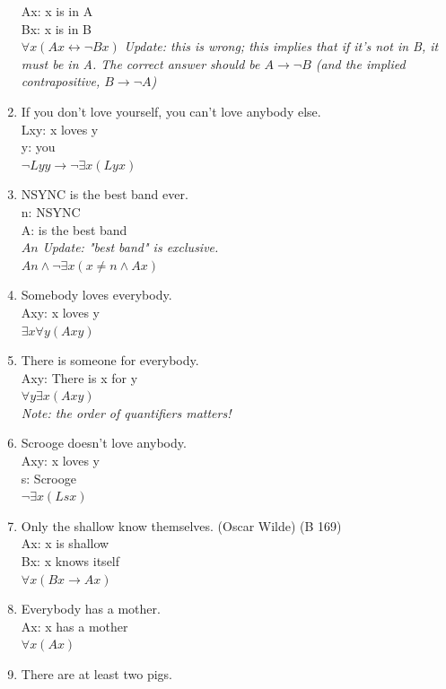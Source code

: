\documentclass{article}
\begin{document}
\begin{enumerate}
            Ax: x is in A\\
            Bx: x is in B\\
            $\forall x(Ax \leftrightarrow \neg Bx)$
            \textit{Update: this is wrong; this implies that if it's not in B, it must be in A. The correct answer should be $A \to \neg B$ (and the implied contrapositive, $B \to \neg A$)}
      \item If you don't love yourself, you can't love anybody else.\\
            Lxy: x loves y\\
            y: you\\
            $\neg Lyy \to \neg \exists x(Lyx)$
      \item NSYNC is the best band ever.\\
            n: NSYNC\\
            A: is the best band\\
            $An$
            \textit{Update: "best band" is exclusive.}\\
            $An  \land \neg \exists x (x \neq n \land Ax)$
      \item Somebody loves everybody.\\
            Axy: x loves y\\
            $\exists x \forall y (Axy)$
      \item There is someone for everybody.\\
            Axy: There is x for y\\
            $\forall y \exists x(Axy)$\\
            \textit{Note: the order of quantifiers matters!}
      \item Scrooge doesn't love anybody.\\
            Axy: x loves y\\
            s: Scrooge\\
            $\neg \exists x (Lsx)$
      \item Only the shallow know themselves. (Oscar Wilde) (B 169)\\
            Ax: x is shallow\\
            Bx: x knows itself\\
            $\forall x(Bx \to Ax)$
      \item Everybody has a mother.\\
            Ax: x has a mother\\
            $\forall x(Ax)$
      \item There are at least two pigs.\\

\end{enumerate}
\end{document}

